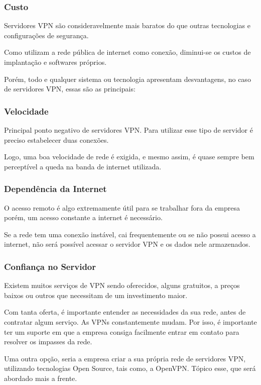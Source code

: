\documentclass[12pt]{article}
\begin{document}
\subsubsection{Custo}
Servidores VPN são consideravelmente mais baratos do que outras tecnologias e configurações de segurança.

Como utilizam a rede pública de internet como conexão, diminui-se os custos de implantação e softwares próprios.


Porém, todo e qualquer sistema ou tecnologia apresentam desvantagens, no caso de servidores VPN, essas são as principais:

\subsubsection{Velocidade}
Principal ponto negativo de servidores VPN. Para utilizar esse tipo de servidor é preciso estabelecer duas conexões.

Logo, uma boa velocidade de rede é exigida, e mesmo assim, é quase sempre bem perceptível a queda na banda de internet utilizada.

\subsubsection{Dependência da Internet}
O acesso remoto é algo extremamente útil para se trabalhar fora da empresa porém, um acesso constante a internet é necessário.

Se a rede tem uma conexão instável, cai frequentemente ou se não possui acesso a internet, não será possível acessar o servidor VPN e os dados nele armazenados.

\subsubsection{Confiança no Servidor}
Existem muitos serviços de VPN sendo oferecidos, alguns gratuitos, a preços baixos ou outros que necessitam de um investimento maior.

Com tanta oferta, é importante entender as necessidades da sua rede, antes de contratar algum serviço.  As VPNs constantemente mudam. Por isso, é importante ter um suporte em que a empresa consiga facilmente entrar em contato para resolver os impasses da rede.

Uma outra opção, seria a empresa criar a sua própria rede de servidores VPN, utilizando tecnologias Open Source, tais como, a OpenVPN. Tópico esse, que será abordado mais a frente.
\end{document}
